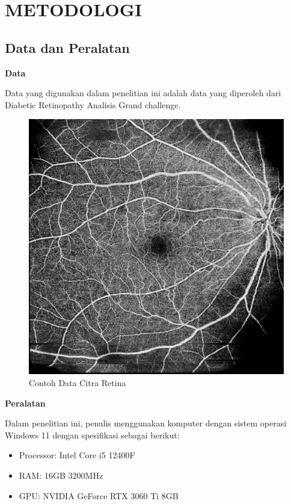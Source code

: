 \chapter{METODOLOGI}


\section{Data dan Peralatan}

\textbf{Data}

Data yang digunakan dalam penelitian ini adalah data yang diperoleh dari Diabetic Retinopathy Analisis Grand challenge.

\begin{figure} [H] \centering
  \includegraphics[scale=0.2]{gambar/exampleimage.png}
  \caption{Contoh Data Citra Retina}
  \label{fig:citraRetina}
\end{figure}

\textbf{Peralatan}

Dalam penelitian ini, penulis menggunakan komputer dengan sistem operasi Windows 11 dengan spesifikasi sebagai berikut:
\begin{itemize}
  \item Processor: Intel Core i5 12400F
  \item RAM: 16GB 3200MHz
  \item GPU: NVIDIA GeForce RTX 3060 Ti 8GB
\end{itemize}

